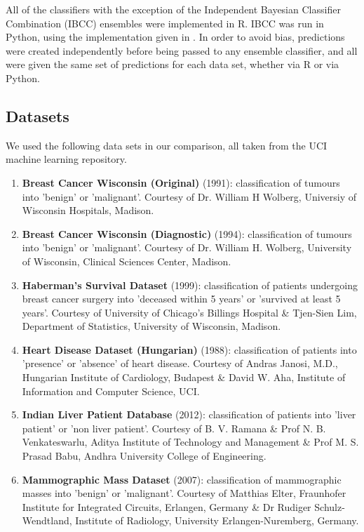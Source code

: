 \documentclass{bmcart}
\begin{document}
All of the classifiers with the exception of the Independent Bayesian Classifier Combination (IBCC) ensembles were implemented in R. IBCC was run in Python, using the implementation given in \cite{Simpson13}. In order to avoid bias, predictions were created independently before being passed to any ensemble classifier, and all were given the same set of predictions for each data set, whether via R or via Python.


\subsection*{Datasets}
We  used the following data sets in our comparison, all taken from the UCI machine learning repository\cite{UCIrep}.

\begin{enumerate}
    \item \textbf{Breast Cancer Wisconsin (Original)} (1991): classification of tumours into 'benign' or 'malignant'. Courtesy of Dr. William H Wolberg, Universiy of Wisconsin Hospitals, Madison.
    \item \textbf{Breast Cancer Wisconsin (Diagnostic)} (1994): classification of tumours into 'benign' or 'malignant'. Courtesy of Dr. William H. Wolberg, University of Wisconsin, Clinical Sciences Center, Madison.
    \item \textbf{Haberman's Survival Dataset} (1999): classification of patients undergoing breast cancer surgery into 'deceased within 5 years' or 'survived at least 5 years'. Courtesy of University of Chicago's Billings Hospital \& Tjen-Sien Lim, Department of Statistics, University of Wisconsin, Madison.
    \item \textbf{Heart Disease Dataset (Hungarian)} (1988): classification of patients into 'presence' or 'absence' of heart disease. Courtesy of Andras Janosi, M.D., Hungarian Institute of Cardiology, Budapest \& David W. Aha, Institute of Information and Computer Science, UCI.
    \item \textbf{Indian Liver Patient Database} (2012): classification of patients into 'liver patient' or 'non liver patient'. Courtesy of B. V. Ramana \& Prof N. B. Venkateswarlu, Aditya Institute of Technology and Management \& Prof M. S. Prasad Babu, Andhra University College of Engineering.
    \item \textbf{Mammographic Mass Dataset} (2007): classification of mammographic masses into 'benign' or 'malignant'. Courtesy of Matthias Elter, Fraunhofer Institute for Integrated Circuits, Erlangen, Germany \& Dr Rudiger Schulz-Wendtland, Institute of Radiology, University Erlangen-Nuremberg, Germany.

\end{enumerate}
\end{document}

